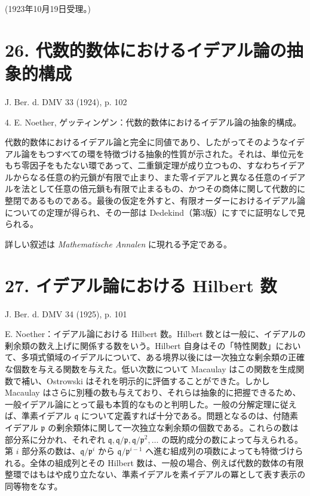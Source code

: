 \documentclass[11pt]{article}
\begin{document}
\begin{center}
(1923年10月19日受理。)
\end{center}

\section*{26. 代数的数体におけるイデアル論の抽象的構成}

\begin{center}
J. Ber. d. DMV 33 (1924), p. 102
\end{center}

4. E. Noether, ゲッティンゲン：代数的数体におけるイデアル論の抽象的構成。

代数的数体におけるイデアル論と完全に同値であり、したがってそのようなイデアル論をもつすべての環を特徴づける抽象的性質が示された。それは、単位元をもち零因子をもたない環であって、二重鎖定理が成り立つもの、すなわちイデアルからなる任意の約元鎖が有限で止まり、また零イデアルと異なる任意のイデアルを法として任意の倍元鎖も有限で止まるもの、かつその商体に関して代数的に整閉であるものである。最後の仮定を外すと、有限オーダーにおけるイデアル論についての定理が得られ、その一部は Dedekind（第3版）にすでに証明なしで見られる。

詳しい叙述は \emph{Mathematische Annalen} に現れる予定である。

\section*{27. イデアル論における Hilbert 数}

\begin{center}
J. Ber. d. DMV 34 (1925), p. 101
\end{center}

E. Noether：イデアル論における Hilbert 数。Hilbert 数とは一般に、イデアルの剰余類の数え上げに関係する数をいう。Hilbert 自身はその「特性関数」において、多項式領域のイデアルについて、ある境界以後には一次独立な剰余類の正確な個数を与える関数を与えた。低い次数について Macaulay はこの関数を生成関数で補い、Ostrowski はそれを明示的に評価することができた。しかし Macaulay はさらに別種の数も与えており、それらは抽象的に把握できるため、一般イデアル論にとって最も本質的なものと判明した。一般の分解定理に従えば、準素イデアル $\mathfrak q$ について定義すれば十分である。問題となるのは、付随素イデアル $\mathfrak p$ の剰余類体に関して一次独立な剰余類の個数である。これらの数は部分系に分かれ、それぞれ $\mathfrak q,\mathfrak q/\mathfrak p,\mathfrak q/\mathfrak p^2,\ldots$ の既約成分の数によって与えられる。第 $i$ 部分系の数は、$\mathfrak q/\mathfrak p^i$ から $\mathfrak q/\mathfrak p^{i-1}$ へ進む組成列の項数によっても特徴づけられる。全体の組成列とその Hilbert 数は、一般の場合、例えば代数的数体の有限整環ではもはや成り立たない、準素イデアルを素イデアルの冪として表す表示の同等物をなす。
\end{document}
